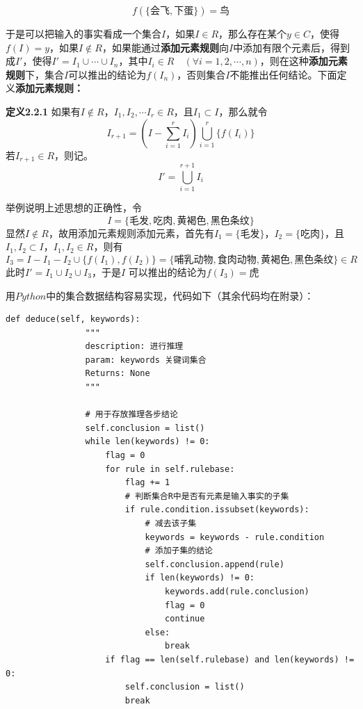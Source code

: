 \documentclass[a4paper]{article}   %
\begin{document}
 	\begin{equation*}
 		f(\{\text{会飞}, \text{下蛋}\}) = \text{鸟}
 	\end{equation*} \par
 	于是可以把输入的事实看成一个集合$ I $，如果$ I \in R $，那么存在某个$ y \in C $，使得$ f(I) = y $，如果$ I \notin R $，如果能通过\textbf{添加元素规则}向$ I $中添加有限个元素后，得到成$ I' $，使得$ I'=I_1 \cup \cdots \cup I_n $，其中$ I_i \in R \quad (\forall i = 1, 2, \cdots, n) $，则在这种\textbf{添加元素规则}下，集合$ I $可以推出的结论为$ f(I_n) $，否则集合$ I $不能推出任何结论。下面定义\textbf{添加元素规则：} \par 
 	\textbf{定义2.2.1} 如果有$ I \notin R $，$ I_1, I_2, \cdots I_r \in R $，且$ I_1 \subset I $，那么就令
 	\begin{equation*}
 		I_{r+1} = \left(I - \sum\limits_{i=1}^{r}I_i\right) \bigcup\limits_{i=1}^{r} \{f(I_i)\}
 	\end{equation*}
 	若$ I_{r+1} \in R $，则记。
 	\begin{equation*}
 		I' = \bigcup\limits_{i=1}^{r+1} I_i
 	\end{equation*}
 	\par 
 	举例说明上述思想的正确性，令
 	\begin{equation*}
 		I = \{\text{毛发}, \text{吃肉}, \text{黄褐色}, \text{黑色条纹}\}
 	\end{equation*}
 	显然$ I \notin R $，故用添加元素规则添加元素，首先有$ I_1 = \{\text{毛发}\} $，$ I_2 = \{\text{吃肉}\} $，且$ I_1, I_2 \subset I $，$ I_1, I_2 \in R $，则有
 	\begin{equation*}
 		I_3 = I - I_1 - I_2 \cup \{f(I_1), f(I_2)\} = \{\text{哺乳动物}, \text{食肉动物}, \text{黄褐色}, \text{黑色条纹}\} \in R
 	\end{equation*}
 	此时$ I' = I_1 \cup I_2 \cup I_3 $，于是$ I $ 可以推出的结论为$ f(I_3) = \text{虎} $ \par 
 	用$ Python $中的集合数据结构容易实现，代码如下（{\color{blue}其余代码均在附录}）：\par
 	\begin{lstlisting}[style=Python]
 		    def deduce(self, keywords):
 		        """
 		        description: 进行推理
 		        param: keywords 关键词集合
 		        Returns: None
 		        """
 		        
 		        # 用于存放推理各步结论
 		        self.conclusion = list()
 		        while len(keywords) != 0:
 		            flag = 0
 		            for rule in self.rulebase:
 		                flag += 1
 		                # 判断集合R中是否有元素是输入事实的子集
 		                if rule.condition.issubset(keywords):
 		                    # 减去该子集
 		                    keywords = keywords - rule.condition
 		                    # 添加子集的结论
 		                    self.conclusion.append(rule)
 		                    if len(keywords) != 0:
 		                        keywords.add(rule.conclusion)
 		                        flag = 0
 		                        continue
 		                    else:
 		                        break
 		            if flag == len(self.rulebase) and len(keywords) != 0:
 		                self.conclusion = list()
 		                break
 	\end{lstlisting}
\end{document}
